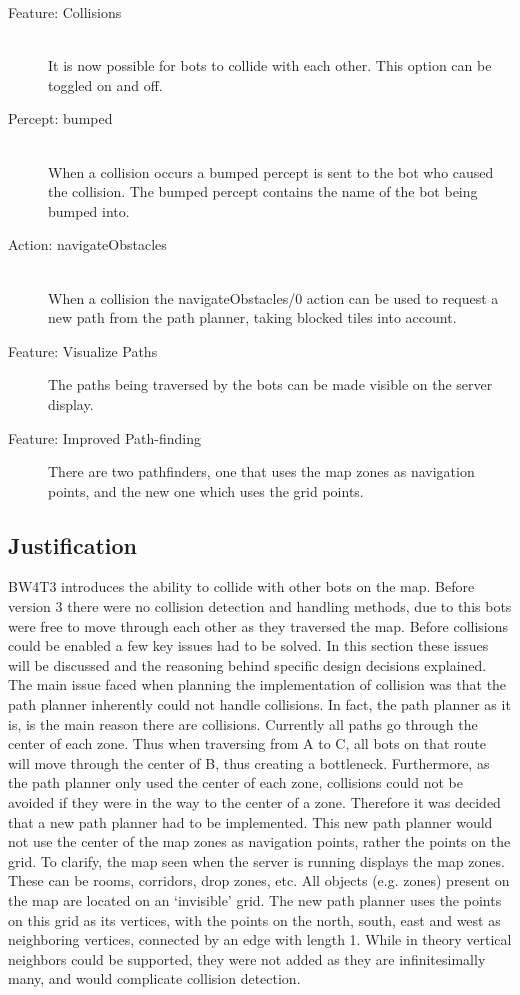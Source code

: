 \begin{description}
	\item[Feature: Collisions] \hfill \\
		It is now possible for bots to collide with each other. This option can be toggled on and off.
	\item[Percept: bumped] \hfill \\
		When a collision occurs a bumped percept is sent to the bot who caused the collision. The bumped percept contains the name of the bot being bumped into.
	\item[Action: navigateObstacles] \hfill \\
		When a collision the navigateObstacles/0 action can be used to request a new path from the path planner, taking blocked tiles into account.
	\item[Feature: Visualize Paths]
		The paths being traversed by the bots can be made visible on the server display. 
	\item[Feature: Improved Path-finding]
		There are two pathfinders, one that uses the map zones as navigation points, and the new one which uses the grid points. 
\end{description}
		
\subsection*{Justification}
BW4T3 introduces the ability to collide with other bots on the map. Before version 3 there were no collision detection and handling methods, due to this bots were free to move through each other as they traversed the map. Before collisions could be enabled a few key issues had to be solved. In this section these issues will be discussed and the reasoning behind specific design decisions explained. \\

The main issue faced when planning the implementation of collision was that the path planner inherently could not handle collisions. In fact, the path planner as it is, is the main reason there are collisions. Currently all paths go through the center of each zone. Thus when traversing from A to C, all bots on that route will move through the center of B, thus creating a bottleneck. Furthermore, as the path planner only used the center of each zone, collisions could not be avoided if they were in the way to the center of a zone.
Therefore it was decided that a new path planner had to be implemented. This new path planner would not use the center of the map zones as navigation points, rather the points on the grid. To clarify, the map seen when the server is running displays the map zones. These can be rooms, corridors, drop zones, etc. All objects (e.g. zones) present on the map are located on an `invisible' grid. The new path planner uses the points on this grid as its vertices, with the points on the north, south, east and west as neighboring vertices, connected by an edge with length 1. 
While in theory vertical neighbors could be supported, they were not added as they are infinitesimally many, and would complicate collision detection.  \\

